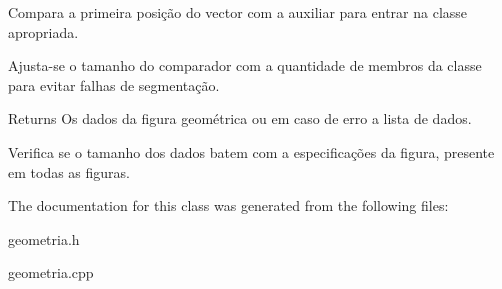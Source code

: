 Compara a primeira posição do vector com a auxiliar para entrar na classe apropriada.

Ajusta-\/se o tamanho do comparador com a quantidade de membros da classe para evitar falhas de segmentação. \begin{DoxyReturn}{Returns}
Os dados da figura geométrica ou em caso de erro a lista de dados.
\end{DoxyReturn}
Verifica se o tamanho dos dados batem com a especificações da figura, presente em todas as figuras.

The documentation for this class was generated from the following files\+:\begin{DoxyCompactItemize}
\item 
geometria.\+h\item 
geometria.\+cpp\end{DoxyCompactItemize}
